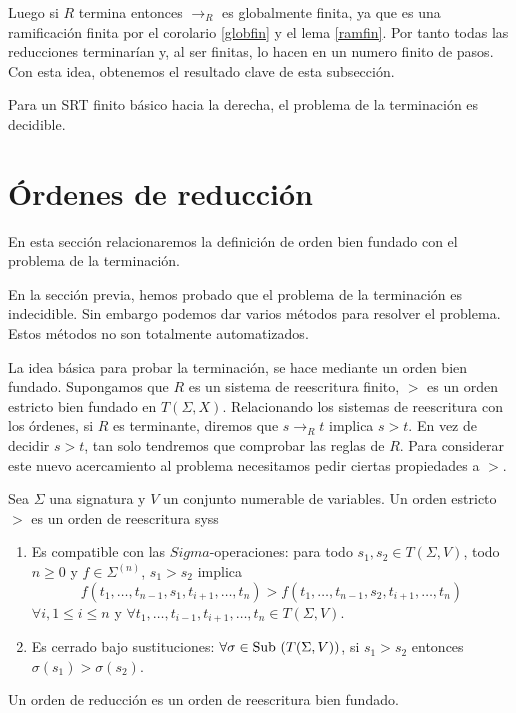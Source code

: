 Luego si $R$ termina entonces $\rightarrow_R$ es globalmente finita,
ya que es una ramificación finita por el corolario \ref{globfin} y el
lema \ref{ramfin}. Por tanto todas las reducciones terminarían y, al
ser finitas, lo hacen en un numero finito de pasos. Con esta idea,
obtenemos el resultado clave de esta subsección.

\begin{teor}
  Para un SRT finito básico hacia la derecha, el problema de la
  terminación es decidible.
\end{teor}

\section{Órdenes de reducción}

En esta sección relacionaremos la definición de orden bien fundado con
el problema de la terminación.

En la sección previa, hemos probado que el problema de la terminación
es indecidible. Sin embargo podemos dar varios métodos para resolver
el problema. Estos métodos no son totalmente automatizados.

La idea básica para probar la terminación, se hace mediante un orden
bien fundado. Supongamos que $R$ es un sistema de reescritura finito,
$>$ es un orden estricto bien fundado en $T(\Sigma, X)$. Relacionando
los sistemas de reescritura con los órdenes, si $R$ es terminante,
diremos que $s \rightarrow_R t$ implica $s > t$. En vez de decidir $s > t$,
tan solo tendremos que comprobar las reglas de $R$. Para considerar
este nuevo acercamiento al problema necesitamos pedir ciertas
propiedades a $>$.

\begin{defi}
  Sea $\Sigma$ una signatura y $V$ un conjunto numerable de
  variables. Un orden estricto $>$ es un orden de reescritura syss
  \begin{enumerate}
  \item Es compatible con las $Sigma$-operaciones: para todo
    $s_1,s_2 \in T(\Sigma, V)$, todo $n \geq 0$ y
    $f \in \Sigma^{(n)}$, $s_1 > s_2$ implica
    \[ f(t_1, \dots, t_{n-1}, s_1, t_{i+1}, \dots, t_n) > f(t_1,
      \dots, t_{n-1}, s_2, t_{i+1}, \dots, t_n) \]
    $\forall i, 1 \leq i \leq n$ y
    $\forall t_1, \dots, t_{i-1}, t_{i+1}, \dots, t_n \in T(\Sigma,
    V)$. %
  \item Es cerrado bajo sustituciones:
    $\forall \sigma \in \mbox{Sub }(T(\Sigma,V))$, si $s_1 > s_2$ entonces
    $\sigma(s_1) > \sigma(s_2)$.
  \end{enumerate}
  Un orden de reducción es un orden de reescritura bien fundado.
\end{defi}

